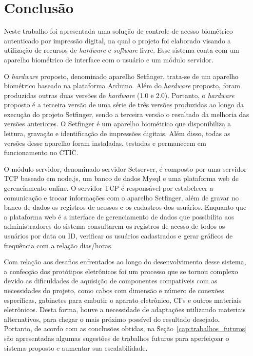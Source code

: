 \chapter{Conclusão\label{cap:conclusao}}

Neste trabalho foi apresentada uma solução de controle de acesso biométrico autenticado por impressão digital, na qual o projeto foi elaborado visando a utilização de recursos de \textit{hardware} e \textit{software} livre. Esse sistema conta com um aparelho biométrico de interface com o usuário e um módulo servidor.

O \textit{hardware} proposto, denominado aparelho Setfinger, trata-se de um aparelho biométrico baseado na plataforma Arduino. Além do \textit{hardware} proposto, foram produzidas outras duas versões de \textit{hardware} (1.0 e 2.0). Portanto, o \textit{hardware} proposto é a terceira versão de uma série de três versões produzidas ao longo da execução do projeto Setfinger, sendo a terceira versão o resultado da melhoria das versões anteriores. O Setfinger é um aparelho biométrico que disponibiliza a leitura, gravação e identificação de impressões digitais. Além disso, todas as versões desse aparelho foram instaladas, testadas e permanecem em funcionamento no CTIC.

O módulo servidor, denominado servidor Setserver, é composto por uma servidor TCP baseado em node.js, um banco de dados Mysql e uma plataforma web de gerenciamento online. O servidor TCP é responsável por estabelecer a comunicação e trocar informações com o aparelho Setfinger, além de gravar no banco de dados os registros de acessos e os cadastros dos usuários. Enquanto que a plataforma web é a interface de gerenciamento de dados que possibilita aos administradores do sistema consultarem os registros de acesso de todos os usuários por data ou ID, verificar os usuários cadastrados e gerar gráficos de frequência com a relação dias/horas. 

Com relação aos desafios enfrentados ao longo do desenvolvimento desse sistema, a confecção dos protótipos eletrônicos foi um processo que se tornou complexo devido as dificuldades de aquisição de componentes compatíveis com as necessidades do projeto, como cabos com dimensão e número de conexões específicas, gabinetes para embutir o aparato eletrônico, CI's e outros materiais eletrônicos. Desta forma, houve a necessidade de adaptações utilizando materiais alternativos, para chegar o mais próximo possível do resultado desejado. Portanto, de acordo com as conclusões obtidas, na Seção~\ref{cap:trabalhos_futuros} são apresentadas algumas sugestões de trabalhos futuros para aperfeiçoar o sistema proposto e aumentar sua escalabilidade.



